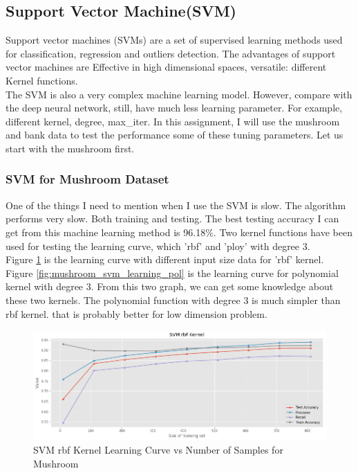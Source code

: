 \documentclass[10pt, conference, compsocconf]{IEEEtran}
\begin{document}
\subsection{Support Vector Machine(SVM)}
Support vector machines (SVMs) are a set of supervised learning methods used for classification, regression and outliers detection. The advantages of support vector machines are Effective in high dimensional spaces, versatile: different Kernel functions. \\
The SVM is also a very complex machine learning model. However, compare with the deep neural network, still, have much less learning parameter. For example, different kernel, degree, max\_iter. In this assignment, I will use the mushroom and bank data to test the performance some of these tuning parameters. Let us start with the mushroom first.

\subsubsection{SVM for Mushroom Dataset}
One of the things I need to mention when I use the SVM is slow. The algorithm performs very slow. Both training and testing. The best testing accuracy I can get from this machine learning method is 96.18\%. Two kernel functions have been used for testing the learning curve, which 'rbf' and 'ploy' with degree 3.\\
Figure \ref{fig:mushroom_svm_learning_rbf} is the learning curve with different input size data for 'rbf' kernel. Figure \ref{fig:mushroom_svm_learning_pol} is the learning curve for polynomial kernel with degree 3. From this two graph, we can get some knowledge about these two kernels. The polynomial function with degree 3 is much simpler than rbf kernel. that is probably better for low dimension problem. 

\begin{figure}[h]
	\centering
	\includegraphics[scale = 0.25]{image/mush_svm_learning_rbf.png}
	\caption{SVM rbf Kernel Learning Curve vs Number of Samples for Mushroom}
	\label{fig:mushroom_svm_learning_rbf}
\end{figure}  
\end{document}
